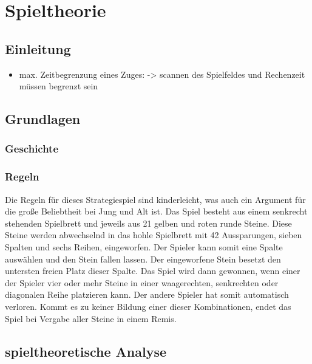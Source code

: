 \chapter{Spieltheorie}
\label{cha:Grundlagen}

%
%
\section{Einleitung}
\begin{itemize}
	\item max. Zeitbegrenzung eines Zuges: -> scannen des Spielfeldes und Rechenzeit müssen begrenzt sein
\end{itemize}
\section{Grundlagen}
\subsection{Geschichte}
\subsection{Regeln}
Die Regeln für dieses Strategiespiel sind kinderleicht, was auch ein Argument für die große Beliebtheit bei Jung und Alt ist. Das Spiel besteht aus einem senkrecht stehenden Spielbrett und jeweils aus 21 gelben und roten runde Steine. Diese Steine werden abwechselnd in das hohle Spielbrett mit 42 Aussparungen, sieben Spalten und sechs Reihen, eingeworfen. Der Spieler kann somit eine Spalte auswählen und den Stein fallen lassen. Der eingeworfene Stein besetzt den untersten freien Platz dieser Spalte. Das Spiel wird dann gewonnen, wenn einer der Spieler vier oder mehr Steine in einer waagerechten, senkrechten oder diagonalen Reihe platzieren kann. Der andere Spieler hat somit automatisch verloren. Kommt es zu keiner Bildung einer dieser Kombinationen, endet das Spiel bei Vergabe aller Steine in einem Remis.

\section{spieltheoretische Analyse}
